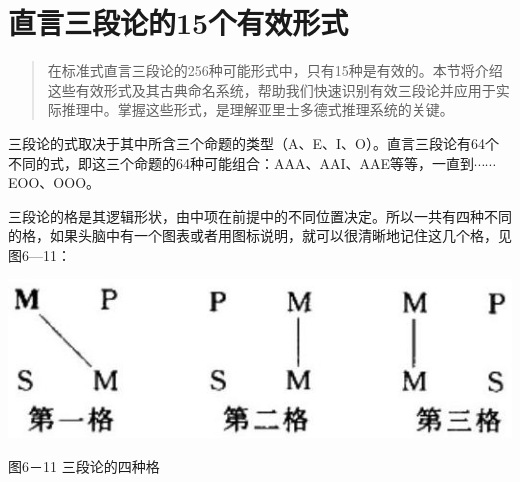 \section{直言三段论的15个有效形式}

\begin{quotation}
在标准式直言三段论的256种可能形式中，只有15种是有效的。本节将介绍这些有效形式及其古典命名系统，帮助我们快速识别有效三段论并应用于实际推理中。掌握这些形式，是理解亚里士多德式推理系统的关键。
\end{quotation}

三段论的式取决于其中所含三个命题的类型（A、E、I、O）。直言三段论有64个不同的式，即这三个命题的64种可能组合：AAA、AAI、AAE等等，一直到$\cdots\cdots$EOO$、\mathrm{OOO}$。

三段论的格是其逻辑形状，由中项在前提中的不同位置决定。所以一共有四种不同的格，如果头脑中有一个图表或者用图标说明，就可以很清晰地记住这几个格，见图6—11：

\begin{center}
\includegraphics[width=\textwidth]{images/2025_05_15_6a28331d5e7c993ad07ag-288.jpg}

图6－11 三段论的四种格
\end{center}

